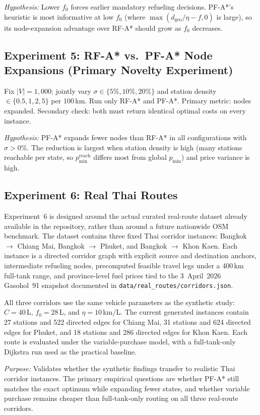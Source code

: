 \textit{Hypothesis:} Lower $f_0$ forces earlier mandatory refueling decisions.
PF-A*'s heuristic is most informative at low $f_0$ (where $\max(d_{\mathrm{geo}}/\eta - f, 0)$
is large), so its node-expansion advantage over RF-A* should grow as $f_0$ decreases.

\subsection{Experiment 5: RF-A* vs.\ PF-A* Node Expansions (Primary Novelty Experiment)}

Fix $|V|=1{,}000$; jointly vary $\sigma \in \{5\%,10\%,20\%\}$ and station density
$\in \{0.5, 1, 2, 5\}$ per 100\,km.
Run only RF-A* and PF-A*.
Primary metric: nodes expanded.
Secondary check: both must return identical optimal costs on every instance.

\textit{Hypothesis:} PF-A* expands fewer nodes than RF-A* in all configurations with
$\sigma > 0\%$.
The reduction is largest when station density is high (many stations reachable per state, so
$p_{\min}^{\mathrm{reach}}$ differs most from global $p_{\min}$) and price variance is high.

\subsection{Experiment 6: Real Thai Routes}

Experiment~6 is designed around the actual curated real-route dataset already available in the
repository, rather than around a future nationwide OSM benchmark.
The dataset contains three fixed Thai corridor instances:
Bangkok $\to$ Chiang Mai, Bangkok $\to$ Phuket, and Bangkok $\to$ Khon Kaen.
Each instance is a directed corridor graph with explicit source and destination anchors,
intermediate refueling nodes, precomputed feasible travel legs under a 400\,km full-tank
range, and province-level fuel prices tied to the 3~April~2026 Gasohol~91 snapshot
documented in \texttt{data/real\_routes/corridors.json}.

All three corridors use the same vehicle parameters as the synthetic study:
$C=40$\,L, $f_0=28$\,L, and $\eta=10$\,km/L.
The current generated instances contain 27 stations and 522 directed edges for Chiang Mai,
31 stations and 624 directed edges for Phuket, and 18 stations and 286 directed edges for
Khon Kaen.
Each route is evaluated under the variable-purchase model, with a full-tank-only Dijkstra run
used as the practical baseline.

\textit{Purpose:} Validates whether the synthetic findings transfer to realistic Thai corridor
instances.
The primary empirical questions are whether PF-A* still matches the exact optimum while
expanding fewer states, and whether variable purchase remains cheaper than full-tank-only
routing on all three real-route corridors.

